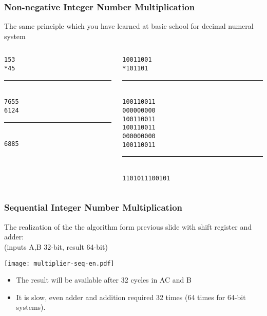 \documentclass{beamer}
\begin{document}
\begin{frame}
\frametitle{Non-negative Integer Number Multiplication}

The same principle which you have learned at basic school for decimal numeral system
\begin{columns}
\begin{column}{0.4\textwidth}
\texttt{\phantom{xxx}153\phantom{xx}}\\
\texttt{\phantom{xxx}*45\phantom{xx}}\\
\vspace{-8pt}
\rule[0pt]{1.5cm}{0.1pt}\\
\texttt{\phantom{xxx}765\phantom{x}5}\\
\texttt{\phantom{xx}612\phantom{xx}4}\\
\vspace{-8pt}
\rule[0pt]{1.5cm}{0.1pt}\\
\texttt{\phantom{xx}6885\phantom{xx}}\\
\end{column}
\hfill
\begin{column}{0.4\textwidth}
\texttt{\phantom{xxxxxx}10011001\phantom{xx}}\\
\texttt{\phantom{xxxxxxx}*101101\phantom{xx}}\\
\vspace{-8pt}
\rule[0pt]{3cm}{0.4pt}\\
\texttt{\phantom{xxxxxx}10011001\phantom{x}1}\\
\texttt{\phantom{xxxxx}00000000\phantom{xx}0}\\
\texttt{\phantom{xxxx}10011001\phantom{xxx}1}\\
\texttt{\phantom{xxx}10011001\phantom{xxxx}1}\\
\texttt{\phantom{xx}00000000\phantom{xxxxx}0}\\
\texttt{\phantom{x}10011001\phantom{xxxxxx}1}\\
\vspace{-8pt}
\rule[0pt]{3cm}{0.4pt}\\
\texttt{\phantom{x}1101011100101\phantom{xx}}\\
\end{column}
\end{columns}

\end{frame}


\begin{frame}
\frametitle{Sequential Integer Number Multiplication}

The realization of the the algorithm form previous slide with shift register and adder:\\
(inputs A,B 32-bit, result 64-bit)
\begin{center}
\texttt{[image: multiplier-seq-en.pdf]}
\end{center}
\begin{itemize}
\item The result will be available after 32 cycles in AC and B 
\item It is slow, even adder and addition required 32 times (64 times for 64-bit systems).
\end{itemize}
\end{frame}
\end{document}
